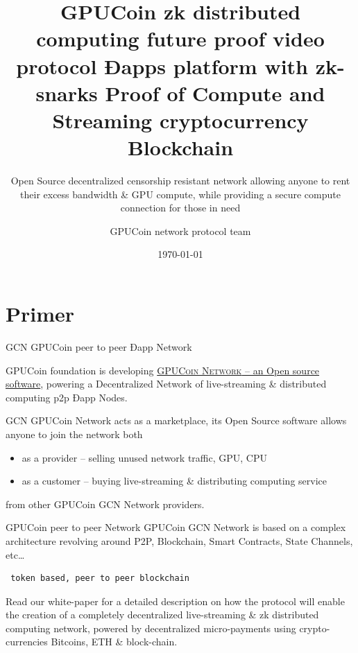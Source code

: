 \documentclass[10pt,handout]{beamer}
\title{GPUCoin zk distributed computing future proof video protocol Ðapps platform with zk-snarks Proof of Compute and Streaming cryptocurrency Blockchain}
\subtitle{Open Source decentralized censorship resistant network allowing anyone to rent their excess bandwidth \& GPU compute, while providing a secure compute connection for those in need}
\date{\today}
\author{GPUCoin network protocol team}
\institute{ GPUCoin Foundation}
\newcommand{\themename}{\textbf{\textsc{metropolis}}\xspace}
\begin{document}
\maketitle


\section{Primer}

{%

\begin{frame}[fragile]{GCN GPUCoin peer to peer Ðapp Network }

 GPUCoin foundation is developing \href{https://onhoot.com/tokensale}{\textsc{GPUCoin Network} – an Open source software}, powering a Decentralized Network of live-streaming \& distributed computing p2p Ðapp Nodes.
 

GCN GPUCoin Network acts as a marketplace, its Open Source software allows anyone to join the network both 

\begin{itemize}
\item as a provider – selling unused network traffic, GPU, CPU
\item as a customer – buying live-streaming \& distributing computing service
\end{itemize}
 from other GPUCoin GCN Network providers. 
\end{frame}
}%
\begin{frame}[fragile]{GPUCoin peer to peer Network }
GPUCoin GCN Network is based on a complex architecture revolving around P2P, Blockchain, Smart Contracts, State Channels, etc\ldots
 \begin{verbatim} 
 token based, peer to peer blockchain 
 \end{verbatim}
 
 Read our white-paper for a detailed description on how the protocol will enable the creation of a completely decentralized live-streaming \& zk distributed computing network, powered by decentralized micro-payments using crypto-currencies Bitcoins, ETH \& block-chain. 


\end{frame}
\end{document}

